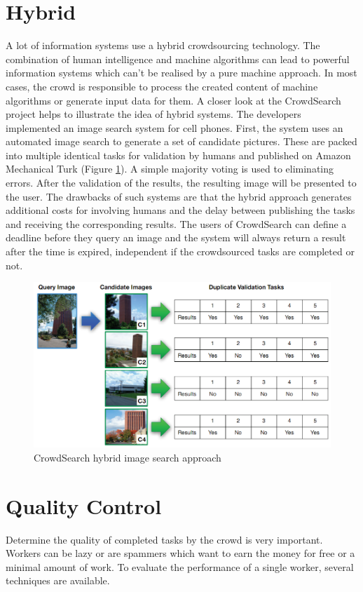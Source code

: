 \section{Hybrid}
A lot of information systems use a hybrid crowdsourcing technology. The combination of human intelligence and machine algorithms can lead to powerful information systems which can't be realised by a pure machine approach. In most cases, the crowd is responsible to process the created content of machine algorithms or generate input data for them. 
A closer look at the CrowdSearch \cite{crowdsearch} project helps to illustrate the idea of hybrid systems. The developers implemented an image search system for cell phones. First, the system uses an automated image search to generate a set of candidate pictures. These are packed into multiple identical tasks for validation by humans and published on Amazon Mechanical Turk (Figure \ref{crowdsearch}). A simple majority voting is used to eliminating errors. After the validation of the results, the resulting image will be presented to the user. The drawbacks of such systems are that the hybrid approach generates additional costs for involving humans and the delay between publishing the tasks and receiving the corresponding results. The users of CrowdSearch can define a deadline before they query an image and the system will always return a result after the time is expired, independent if the crowdsourced tasks are completed or not. 
\begin{figure}
\centering
\includegraphics[scale=0.45]{images/crowdsearch_hybrid.png}
\caption{CrowdSearch hybrid image search approach}
\label{crowdsearch}
\end{figure}

\section{Quality Control}
Determine the quality of completed tasks by the crowd is very important. Workers can be lazy or are spammers which want to earn the money for free or a minimal amount of work. To evaluate the performance of a single worker, several techniques are available. 
